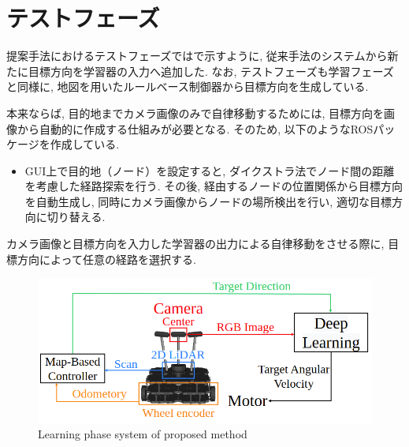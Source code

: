 
\section{テストフェーズ}
提案手法におけるテストフェーズではで示すように, 従来手法のシステムから新たに目標方向を学習器の入力へ追加した. なお, テストフェーズも学習フェーズと同様に, 地図を用いたルールベース制御器から目標方向を生成している. 
\par
本来ならば, 目的地までカメラ画像のみで自律移動するためには, 目標方向を画像から自動的に作成する仕組みが必要となる. 
そのため, 以下のようなROSパッケージを作成している\cite{weighted_graph}.

\begin{itemize}
     \item GUI上で目的地（ノード）を設定すると, ダイクストラ法でノード間の距離を考慮した経路探索を行う. その後, 経由するノードの位置関係から目標方向を自動生成し, 同時にカメラ画像からノードの場所検出を行い, 適切な目標方向に切り替える.
\end{itemize}

\par
カメラ画像と目標方向を入力した学習器の出力による自律移動をさせる際に, 目標方向によって任意の経路を選択する.

\vspace{1cm}

\begin{figure}[hbtp]
  \centering
 \includegraphics[keepaspectratio, scale=0.46]
      {images/suggest_test_phase.png}
 \caption{Learning phase system of proposed method}
 \label{Fig:suggest_test_phase}
\end{figure}

\newpage
